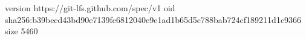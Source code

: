 version https://git-lfs.github.com/spec/v1
oid sha256:b39becd43bd90e7139fe6812040e9e1ad1b65d5c788bab724cf189211d1c9366
size 5460
